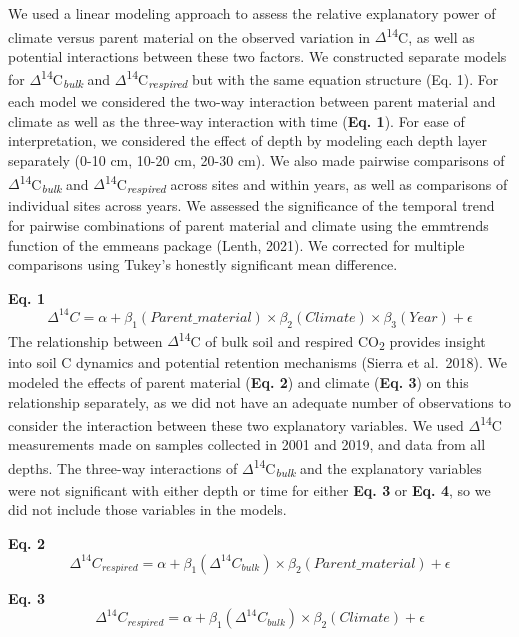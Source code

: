 \documentclass[english,man,floatsintext]{apa6}
\begin{document}
We used a linear modeling approach to assess the relative explanatory power of climate versus parent material on the observed variation in \(\Delta\)\textsuperscript{14}C, as well as potential interactions between these two factors. We constructed separate models for \(\Delta\)\textsuperscript{14}C\textsubscript{\emph{bulk}} and \(\Delta\)\textsuperscript{14}C\textsubscript{\emph{respired}} but with the same equation structure (Eq. 1). For each model we considered the two-way interaction between parent material and climate as well as the three-way interaction with time (\textbf{Eq. 1}). For ease of interpretation, we considered the effect of depth by modeling each depth layer separately (0-10 cm, 10-20 cm, 20-30 cm). We also made pairwise comparisons of \(\Delta\)\textsuperscript{14}C\textsubscript{\emph{bulk}} and \(\Delta\)\textsuperscript{14}C\textsubscript{\emph{respired}} across sites and within years, as well as comparisons of individual sites across years. We assessed the significance of the temporal trend for pairwise combinations of parent material and climate using the emmtrends function of the emmeans package (Lenth, 2021). We corrected for multiple comparisons using Tukey's honestly significant mean difference.

\textbf{Eq. 1}
\[\Delta^{14}C = \alpha + \beta_{1}(Parent\_material) \times \beta_{2}(Climate) \times \beta_{3}(Year) + \epsilon\]
The relationship between \(\Delta\)\textsuperscript{14}C of bulk soil and respired CO\textsubscript{2} provides insight into soil C dynamics and potential retention mechanisms (Sierra et al.~2018). We modeled the effects of parent material (\textbf{Eq. 2}) and climate (\textbf{Eq. 3}) on this relationship separately, as we did not have an adequate number of observations to consider the interaction between these two explanatory variables.
We used \(\Delta\)\textsuperscript{14}C measurements made on samples collected in 2001 and 2019, and data from all depths. The three-way interactions of \(\Delta\)\textsuperscript{14}C\textsubscript{\emph{bulk}} and the explanatory variables were not significant with either depth or time for either \textbf{Eq. 3} or \textbf{Eq. 4}, so we did not include those variables in the models.

\textbf{Eq. 2}
\[\Delta^{14}C_{respired} = \alpha + \beta_{1}(\Delta^{14}C_{bulk}) \times \beta_{2}(Parent\_material) + \epsilon\]

\textbf{Eq. 3}
\[\Delta^{14}C_{respired} = \alpha + \beta_{1}(\Delta^{14}C_{bulk}) \times \beta_{2}(Climate) + \epsilon\]
\end{document}
